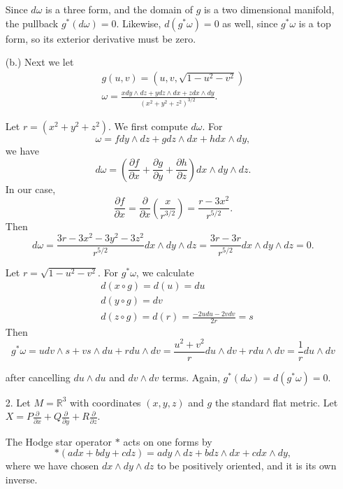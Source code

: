 \documentclass[11pt, reqno]{article}
\theoremstyle{plain}
\theoremstyle{definition}
\theoremstyle{remark}
\newcommand{\RR}{\mathbb{R}}
\begin{document}
\begin{enumerate}
    Since $d\omega$ is a three form, and the domain of $g$ is a two dimensional manifold, the pullback $g^*(d\omega) = 0$. Likewise,
    $d(g^*\omega) = 0$ as well, since $g^*\omega$ is a top form, so its exterior derivative must be zero. 

    (b.) Next we let 
    \begin{gather*}
        g(u,v) = (u, v, \sqrt{1 - u^2 - v^2})\\
        \omega = \frac{x dy \wedge dz + y dz \wedge dx + z dx \wedge dy}{(x^2 + y^2 + z^2)^{3/2}}.
    \end{gather*}

    Let $r = (x^2 + y^2 + z^2)$. We first compute $d\omega$. For 
    \[
        \omega = f dy \wedge dz + g dz \wedge dx + h dx \wedge dy,
    \]
    we have 
    \[
        d\omega = (\frac{\partial f}{\partial x} + \frac{\partial g}{\partial y} + \frac{\partial h}{\partial z}) dx \wedge dy \wedge dz.
    \]
    In our case,
    \[
        \frac{\partial f}{\partial x} = \frac{\partial}{\partial x}\left(\frac{x}{r^{3/2}}\right) = \frac{r - 3x^2}{r^{5/2}}.
    \]
    Then
    \[
        d\omega = \frac{3r - 3x^2 - 3y^2 - 3z^2}{r^{5/2}}dx \wedge dy\wedge dz = \frac{3r - 3r}{r^{5/2}}dx \wedge dy \wedge dz = 0.
    \]

    Let $r = \sqrt{1 - u^2 - v^2}$. For $g^*\omega$, we calculate
    \begin{align*}
        &d(x\circ g) = d(u) = du\\
        &d(y \circ g) = dv\\
        &d(z \circ g) = d(r) = \frac{-2u du - 2v dv}{2r} = s
    \end{align*}
    Then 
    \[
        g^*\omega = u dv \wedge s + v s \wedge du + r du \wedge dv = \frac{u^2 + v^2}{r} du \wedge dv + r du \wedge dv = \frac{1}{r}du \wedge dv
    \]

    after cancelling $du \wedge du$ and $dv \wedge dv$ terms. Again, $g^*(d\omega) = d(g^*\omega) = 0$. 

    \item[2.] Let $M = \RR^3$ with coordinates $(x,y,z)$ and $g$ the standard flat metric. Let $X = P \frac{\partial}{\partial x} + Q 
    \frac{\partial}{\partial y} + R \frac{\partial}{\partial z}$. 

    The Hodge star operator $*$ acts on one forms by 
    \[
        *(a dx + b dy + c dz) = a dy \wedge dz + b dz \wedge dx + c dx \wedge dy,
    \]
    where we have chosen $dx \wedge dy \wedge dz$ to be positively oriented, and it is its own inverse. 


\end{enumerate}
\end{document}
